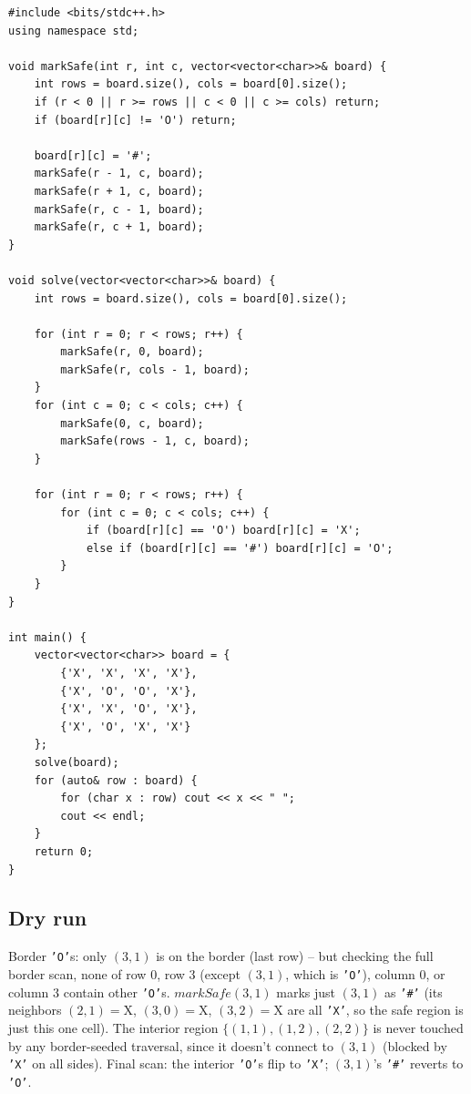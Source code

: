 \begin{lstlisting}
#include <bits/stdc++.h>
using namespace std;

void markSafe(int r, int c, vector<vector<char>>& board) {
    int rows = board.size(), cols = board[0].size();
    if (r < 0 || r >= rows || c < 0 || c >= cols) return;
    if (board[r][c] != 'O') return;

    board[r][c] = '#';
    markSafe(r - 1, c, board);
    markSafe(r + 1, c, board);
    markSafe(r, c - 1, board);
    markSafe(r, c + 1, board);
}

void solve(vector<vector<char>>& board) {
    int rows = board.size(), cols = board[0].size();

    for (int r = 0; r < rows; r++) {
        markSafe(r, 0, board);
        markSafe(r, cols - 1, board);
    }
    for (int c = 0; c < cols; c++) {
        markSafe(0, c, board);
        markSafe(rows - 1, c, board);
    }

    for (int r = 0; r < rows; r++) {
        for (int c = 0; c < cols; c++) {
            if (board[r][c] == 'O') board[r][c] = 'X';
            else if (board[r][c] == '#') board[r][c] = 'O';
        }
    }
}

int main() {
    vector<vector<char>> board = {
        {'X', 'X', 'X', 'X'},
        {'X', 'O', 'O', 'X'},
        {'X', 'X', 'O', 'X'},
        {'X', 'O', 'X', 'X'}
    };
    solve(board);
    for (auto& row : board) {
        for (char x : row) cout << x << " ";
        cout << endl;
    }
    return 0;
}
\end{lstlisting}

\subsection*{Dry run}


Border \texttt{'O'}s: only $(3,1)$ is on the border (last row) -- but
checking the full border scan, none of row $0$, row $3$ (except
$(3,1)$, which is \texttt{'O'}), column $0$, or column $3$ contain
other \texttt{'O'}s. $\textit{markSafe}(3,1)$ marks just $(3,1)$ as
\texttt{'\#'} (its neighbors $(2,1)=\text{X}$, $(3,0)=\text{X}$,
$(3,2)=\text{X}$ are all \texttt{'X'}, so the safe region is just this
one cell). The interior region $\{(1,1),(1,2),(2,2)\}$ is never
touched by any border-seeded traversal, since it doesn't connect to
$(3,1)$ (blocked by \texttt{'X'} on all sides). Final scan: the
interior \texttt{'O'}s flip to \texttt{'X'}; $(3,1)$'s \texttt{'\#'}
reverts to \texttt{'O'}.


